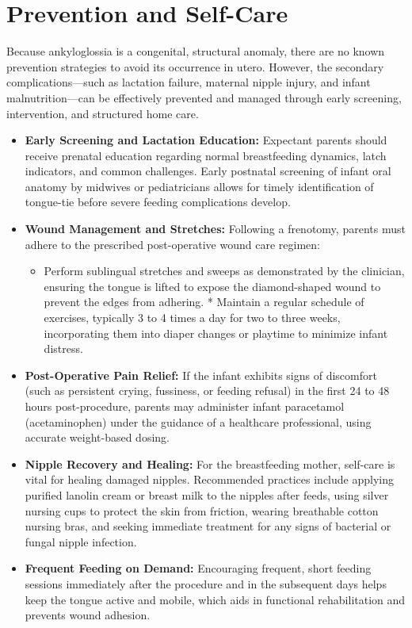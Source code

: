 \section*{Prevention and Self-Care}
Because ankyloglossia is a congenital, structural anomaly, there are no known prevention strategies to avoid its occurrence in utero. However, the secondary complications—such as lactation failure, maternal nipple injury, and infant malnutrition—can be effectively prevented and managed through early screening, intervention, and structured home care.
\begin{itemize}
  \item \textbf{Early Screening and Lactation Education:} Expectant parents should receive prenatal education regarding normal breastfeeding dynamics, latch indicators, and common challenges. Early postnatal screening of infant oral anatomy by midwives or pediatricians allows for timely identification of tongue-tie before severe feeding complications develop.
  \item \textbf{Wound Management and Stretches:} Following a frenotomy, parents must adhere to the prescribed post-operative wound care regimen:
    \begin{itemize}
      \item Perform sublingual stretches and sweeps as demonstrated by the clinician, ensuring the tongue is lifted to expose the diamond-shaped wound to prevent the edges from adhering.
      * Maintain a regular schedule of exercises, typically 3 to 4 times a day for two to three weeks, incorporating them into diaper changes or playtime to minimize infant distress.
    \end{itemize}
  \item \textbf{Post-Operative Pain Relief:} If the infant exhibits signs of discomfort (such as persistent crying, fussiness, or feeding refusal) in the first 24 to 48 hours post-procedure, parents may administer infant paracetamol (acetaminophen) under the guidance of a healthcare professional, using accurate weight-based dosing.
  \item \textbf{Nipple Recovery and Healing:} For the breastfeeding mother, self-care is vital for healing damaged nipples. Recommended practices include applying purified lanolin cream or breast milk to the nipples after feeds, using silver nursing cups to protect the skin from friction, wearing breathable cotton nursing bras, and seeking immediate treatment for any signs of bacterial or fungal nipple infection.
  \item \textbf{Frequent Feeding on Demand:} Encouraging frequent, short feeding sessions immediately after the procedure and in the subsequent days helps keep the tongue active and mobile, which aids in functional rehabilitation and prevents wound adhesion.
\end{itemize}

